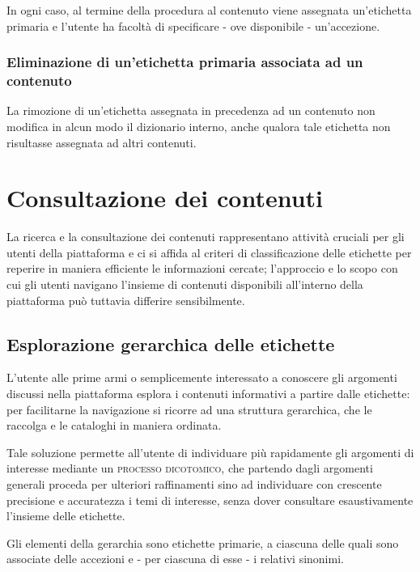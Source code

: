 \documentclass[10pt,a4paper,headinclude,footinclude,hidelinks]{scrreprt} %
\begin{document}
	In ogni caso, al termine della procedura al contenuto viene assegnata un'etichetta primaria e l'utente ha facoltà di specificare - ove disponibile - un'accezione.
	\subsubsection{Eliminazione di un'etichetta primaria associata ad un contenuto}
	La rimozione di un'etichetta assegnata in precedenza ad un contenuto non modifica in alcun modo il dizionario interno, anche qualora tale etichetta non risultasse assegnata ad altri contenuti.

	\section{Consultazione dei contenuti}
	\label{sec:stage:cls:scenari:read}
	La ricerca e la consultazione dei contenuti rappresentano attività cruciali per gli utenti della piattaforma e ci si affida al criteri di classificazione delle etichette per reperire in maniera efficiente le informazioni cercate; l'approccio e lo scopo con cui gli utenti navigano l'insieme di contenuti disponibili all'interno della piattaforma può tuttavia differire sensibilmente.
	\subsection{Esplorazione gerarchica delle etichette}
	L'utente alle prime armi o semplicemente interessato a conoscere gli argomenti discussi nella piattaforma esplora i contenuti informativi a partire dalle etichette: per facilitarne la navigazione si ricorre ad una struttura gerarchica, che le raccolga e le cataloghi in maniera ordinata.

	Tale soluzione permette all'utente di individuare più rapidamente gli argomenti di interesse mediante un \textsc{processo dicotomico}, che partendo dagli argomenti generali proceda per ulteriori raffinamenti sino ad individuare con crescente precisione e accuratezza i temi di interesse, senza dover consultare esaustivamente l'insieme delle etichette.

	Gli elementi della gerarchia sono etichette primarie, a ciascuna delle quali sono associate delle accezioni e - per ciascuna di esse - i relativi sinonimi. 
\end{document}
